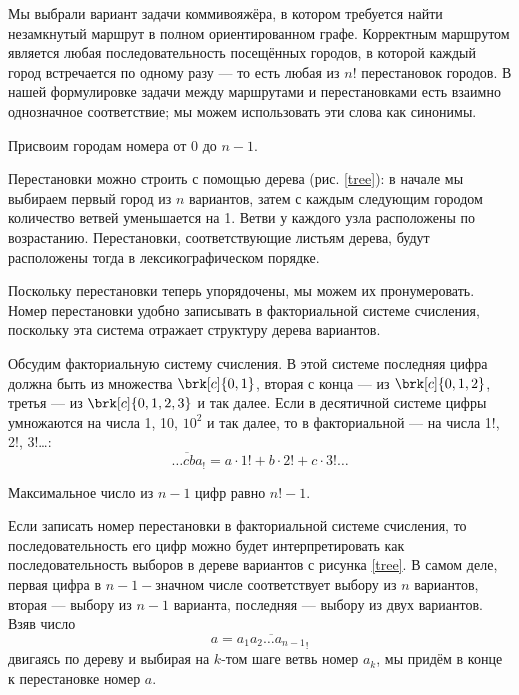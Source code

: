 

Мы выбрали вариант задачи коммивояжёра, в котором требуется найти незамкнутый маршрут в полном ориентированном графе. Корректным маршрутом является любая последовательность посещённых городов, в которой каждый город встречается по одному разу --- то есть любая из $n!$ перестановок городов. В нашей формулировке задачи между маршрутами и перестановками есть взаимно однозначное соответствие; мы можем использовать эти слова как синонимы.


Присвоим городам номера от 0 до $n-1$.

Перестановки можно строить с помощью дерева (рис. \ref{tree}): в начале мы выбираем первый город из $n$ вариантов, затем с каждым следующим городом количество ветвей уменьшается на 1. Ветви у каждого узла расположены по возрастанию. Перестановки, соответствующие листьям дерева, будут расположены тогда в лексикографическом порядке.


Поскольку перестановки теперь упорядочены, мы можем их пронумеровать. Номер перестановки удобно записывать в факториальной системе счисления, поскольку эта система отражает структуру дерева вариантов. 

Обсудим факториальную систему счисления. В этой системе последняя цифра должна быть из множества $\brk[c]{0, 1}$, вторая с конца --- из $\brk[c]{0, 1, 2}$, третья --- из $\brk[c]{0, 1, 2, 3}$ и так далее. Если в десятичной системе цифры умножаются на числа 1, 10, $10^2$ и так далее, то в факториальной --- на числа 1!, 2!, $3!$\dots:
$$
\overline{\dots cba}_! = a \cdot 1! + b \cdot 2! + c \cdot 3! \dots
$$

Максимальное число из $n-1$ цифр равно $n!-1$. 
 
Если записать номер перестановки в факториальной системе счисления, то последовательность его цифр можно будет интерпретировать как последовательность выборов в дереве вариантов с рисунка \ref{tree}. 
В самом деле, первая цифра в $n{-}1{-}$значном числе соответствует выбору из $n$ вариантов, вторая --- выбору из $n-1$ варианта, последняя --- выбору из двух вариантов. 
Взяв число 
$$a = \overline{a_1 a_2 \dots a_{n-1}}_!$$ 
двигаясь по дереву и выбирая на $k$-том шаге ветвь номер $a_k$, мы придём в конце к перестановке номер $a$.

